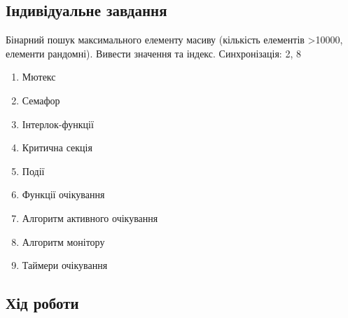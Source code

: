 \documentclass[12pt]{extarticle}
\begin{document}
\subsection*{Індивідуальне завдання}

Бінарний пошук максимального елементу масиву (кількість елементів
>10000, елементи рандомні). Вивести значення та індекс. Синхронізація: 2, 8
\begin{enumerate}
    
\item Мютекс
\item Семафор
\item Інтерлок-функції
\item Критична секція
\item Події
\item Функції очікування
\item Алгоритм активного очікування
\item Алгоритм монітору
\item Таймери очікування
\end{enumerate}
\subsection*{Хід роботи}
\end{document}
